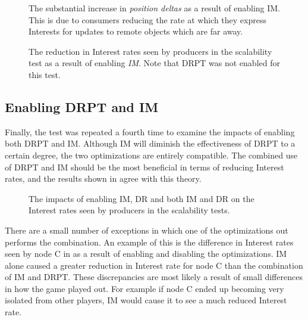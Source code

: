 \begin{figure}[H]
    \centering
    \caption{The substantial increase in \textit{position deltas} as a result of enabling IM. This is due to consumers reducing the rate at which they express Interests for updates to remote objects which are far away. }
    \label{fig:eval:im:pos-deltas}
\end{figure}


\begin{figure}[H]
    \centering
    \caption{The reduction in Interest rates seen by producers in the scalability test as a result of enabling \textit{IM}. Note that DRPT was not enabled for this test.}
    \label{fig:eval:im:interest-impacts}
\end{figure}

\subsection{Enabling DRPT and IM}
Finally, the test was repeated a fourth time to examine the impacts of enabling both DRPT and IM. Although IM will diminish the effectiveness of DRPT to a certain degree, the two optimizations are entirely compatible. The combined use of DRPT and IM should be the most beneficial in terms of reducing Interest rates, and the results shown in  agree with this theory. 

\begin{figure}[H]
    \centering
    \caption{The impacts of enabling IM, DR and both IM and DR on the Interest rates seen by producers in the scalability tests.}
    \label{fig:eval:im-dr:impacts}
\end{figure}


There are a small number of exceptions in which one of the optimizations out performs the combination. An example of this is the difference in Interest rates seen by node C in  as a result of enabling and disabling the optimizations. IM alone caused a greater reduction in Interest rate for node C than the combination of IM and DRPT. These discrepancies are most likely a result of small differences in how the game played out. For example if node C ended up becoming very isolated from other players, IM would cause it to see a much reduced Interest rate. 

